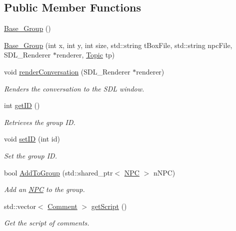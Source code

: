 \subsection*{Public Member Functions}
\begin{DoxyCompactItemize}
\item 
\hyperlink{class_base___group_a96e70ee101d6430696f7b13b07190787}{Base\+\_\+\+Group} ()
\item 
\hyperlink{class_base___group_a056cdec4b61e453cd2125d5e0c5e3b57}{Base\+\_\+\+Group} (int x, int y, int size, std\+::string t\+Box\+File, std\+::string npc\+File, S\+D\+L\+\_\+\+Renderer $\ast$renderer, \hyperlink{class_topic}{Topic} tp)
\item 
void \hyperlink{class_base___group_a44b94b9d83c0aa526c9b51e2a46274cd}{render\+Conversation} (S\+D\+L\+\_\+\+Renderer $\ast$renderer)
\begin{DoxyCompactList}\small\item\em Renders the conversation to the S\+DL window. \end{DoxyCompactList}\item 
int \hyperlink{class_base___group_a7299ae154b26d741ac2f6f794bc3a544}{get\+ID} ()
\begin{DoxyCompactList}\small\item\em Retrieves the group ID. \end{DoxyCompactList}\item 
void \hyperlink{class_base___group_acc6c0adb1efeb47579da87d98450a98a}{set\+ID} (int id)
\begin{DoxyCompactList}\small\item\em Set the group ID. \end{DoxyCompactList}\item 
bool \hyperlink{class_base___group_a585d104ef8dfeaf0fdc0b2ef2089a4d1}{Add\+To\+Group} (std\+::shared\+\_\+ptr$<$ \hyperlink{class_n_p_c}{N\+PC} $>$ n\+N\+PC)
\begin{DoxyCompactList}\small\item\em Add an \hyperlink{class_n_p_c}{N\+PC} to the group. \end{DoxyCompactList}\item 
std\+::vector$<$ \hyperlink{class_comment}{Comment} $>$ \hyperlink{class_base___group_a48dadfbc8cdefca9bdd2c42b99115ad8}{get\+Script} ()
\begin{DoxyCompactList}\small\item\em Get the script of comments. \end{DoxyCompactList}\item 

\end{DoxyCompactItemize}
